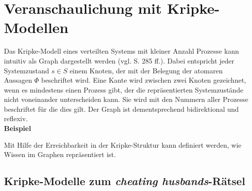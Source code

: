 \section{Veranschaulichung mit Kripke-Modellen}
\label{Kripke-Modelle}
Das Kripke-Modell eines verteilten Systems mit kleiner Anzahl Prozesse kann intuitiv als Graph dargestellt werden (vgl. \cite{kshemkalyani2011distributed} S. 285 ff.). Dabei entspricht jeder Systemzustand $s\in S$ einem Knoten, der mit der Belegung der atomaren Aussagen $\Phi$ beschriftet wird. Eine Kante wird zwischen zwei Knoten gezeichnet, wenn es mindestens einen Prozess gibt, der die repräsentierten Systemzustände nicht voneinander unterscheiden kann. Sie wird mit den Nummern aller Prozesse beschriftet für die dies gilt.
Der Graph ist dementsprechend bidirektional und reflexiv.\\
\textbf{Beispiel}\medskip

Mit Hilfe der Erreichbarkeit in der Kripke-Struktur kann definiert werden, wie Wissen im Graphen repräsentiert ist.


\subsection{Kripke-Modelle zum \textit{cheating husbands}-Rätsel}
